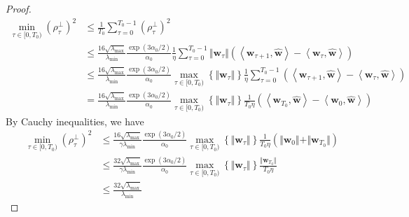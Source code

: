 \documentclass[pdflatex,sn-basic]{sn-jnl}%
\theoremstyle{thmstyleone}%
\begin{document}
\begin{appendices}
\begin{proof}
  \begin{equation*}
  \begin{aligned}
    \min_{\tau \in [0, T_0)} 
    \left(
      \rho_{\tau}^{\perp}
    \right)^2 
    & \le 
    \frac{1}{T_0}
    \sum_{\tau = 0}^{T_0-1}
    \left(
      \rho_{\tau}^{\perp}
    \right)^2 
    \\ & \le 
    \frac{16 \sqrt{\lambda_{\max}}}{\lambda_{\min}}
    \frac{ \exp \left({3 \alpha_0 /2 }\right)}{\alpha_0 }
    \frac{1}{\eta}
    \sum_{\tau = 0}^{T_0-1}
    \Vert \mathbf{w}_\tau \Vert
    \left(
      \left\langle \mathbf{w}_{\tau+1}, \hat{\mathbf{w}} \right\rangle - \left\langle \mathbf{w}_{\tau}, \hat{\mathbf{w}} \right\rangle 
    \right)
    \\ & \le 
    \frac{16 \sqrt{\lambda_{\max}}}{\lambda_{\min}}
    \frac{ \exp \left({3 \alpha_0 /2 }\right)}{\alpha_0 }
    \max_{\tau \in [0, T_0)} \left\{ \Vert \mathbf{w}_\tau \Vert \right\}
    \frac{1}{\eta}
    \sum_{\tau = 0}^{T_0-1}
    \left(
      \left\langle \mathbf{w}_{\tau+1}, \hat{\mathbf{w}} \right\rangle - \left\langle \mathbf{w}_{\tau}, \hat{\mathbf{w}} \right\rangle 
    \right)
    \\ & = 
    \frac{16 \sqrt{\lambda_{\max}}}{\lambda_{\min}}
    \frac{ \exp \left({3 \alpha_0 /2 }\right)}{\alpha_0 }
    \max_{\tau \in [0, T_0)} \left\{ \Vert \mathbf{w}_\tau \Vert \right\}
    \frac{1}{T_0 \eta}
    \left(
      \left\langle \mathbf{w}_{T_0}, \hat{\mathbf{w}} \right\rangle - \left\langle \mathbf{w}_{0}, \hat{\mathbf{w}} \right\rangle 
    \right)
  \end{aligned}
  \end{equation*}
  By Cauchy inequalities, we have 
  \begin{equation*}
  \begin{aligned}
    \min_{\tau \in [0, T_0)} 
    \left(
      \rho_{\tau}^{\perp}
    \right)^2  & \le
    \frac{16 \sqrt{\lambda_{\max}}}{\gamma \lambda_{\min}}
    \frac{ \exp \left({3 \alpha_0 /2 }\right)}{\alpha_0 }
    \max_{\tau \in [0, T_0)} \left\{ \Vert \mathbf{w}_\tau \Vert \right\}
    \frac{1}{T_0 \eta}
    \left(
      \Vert \mathbf{w}_{0} \Vert + \Vert \mathbf{w}_{T_0} \Vert
    \right)
    \\ & \le  
    \frac{32 \sqrt{\lambda_{\max}}}{\gamma \lambda_{\min}}
    \frac{ \exp \left({3 \alpha_0 /2 }\right)}{\alpha_0 }
    \max_{\tau \in [0, T_0)} \left\{ \Vert \mathbf{w}_\tau \Vert \right\}
    \frac{\Vert \mathbf{w}_{T_0} \Vert}{T_0\eta}
    \\ & \le
    \frac{32 \sqrt{\lambda_{\max}}}{\lambda_{\min}}

\end{aligned}
\end{equation*}
\end{proof}
\end{appendices}
\end{document}
